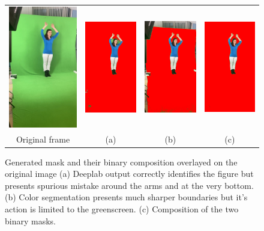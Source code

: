 \begin{figure}
  \centering
  \begin{tabular}{@{}cccc@{}}
    \includegraphics[width=0.187\linewidth]{figures/dataset_images/frame000040.jpg}& 
    \includegraphics[width=0.187\linewidth]{figures/dataset_images/deeplab_000040.jpg}& 
    \includegraphics[width=0.187\linewidth]{figures/dataset_images/in_range_000040.jpg}&
    \includegraphics[width=0.187\linewidth]{figures/dataset_images/combined_000040.jpg} \\
    Original frame &(a) & (b) & (c)
  \end{tabular}
  \caption[Generated mask and their binary composition overlayed on the original image]{Generated mask and their binary composition overlayed on the original image
  \textup{(a)} Deeplab output correctly identifies the figure but presents spurious mistake around the arms and at the very bottom. 
  \textup{(b)} Color segmentation presents much sharper boundaries but it's action is limited to the greenscreen. 
  \textup{(c)} Composition of the two binary masks. 
\label{fig: dataset_examples}}
\end{figure}

